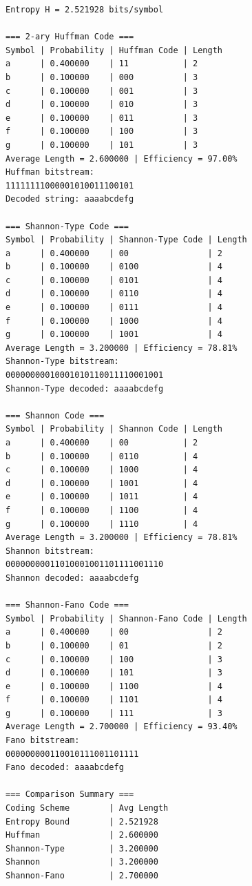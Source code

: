\documentclass{AnantDocumentation}
\begin{document}
\begin{lstlisting}
Entropy H = 2.521928 bits/symbol

=== 2-ary Huffman Code ===
Symbol | Probability | Huffman Code | Length
a      | 0.400000    | 11           | 2
b      | 0.100000    | 000          | 3
c      | 0.100000    | 001          | 3
d      | 0.100000    | 010          | 3
e      | 0.100000    | 011          | 3
f      | 0.100000    | 100          | 3
g      | 0.100000    | 101          | 3
Average Length = 2.600000 | Efficiency = 97.00%
Huffman bitstream:
11111111000001010011100101
Decoded string: aaaabcdefg

=== Shannon-Type Code ===
Symbol | Probability | Shannon-Type Code | Length
a      | 0.400000    | 00                | 2
b      | 0.100000    | 0100              | 4
c      | 0.100000    | 0101              | 4
d      | 0.100000    | 0110              | 4
e      | 0.100000    | 0111              | 4
f      | 0.100000    | 1000              | 4
g      | 0.100000    | 1001              | 4
Average Length = 3.200000 | Efficiency = 78.81%
Shannon-Type bitstream:
00000000010001010110011110001001
Shannon-Type decoded: aaaabcdefg

=== Shannon Code ===
Symbol | Probability | Shannon Code | Length
a      | 0.400000    | 00           | 2
b      | 0.100000    | 0110         | 4
c      | 0.100000    | 1000         | 4
d      | 0.100000    | 1001         | 4
e      | 0.100000    | 1011         | 4
f      | 0.100000    | 1100         | 4
g      | 0.100000    | 1110         | 4
Average Length = 3.200000 | Efficiency = 78.81%
Shannon bitstream:
00000000011010001001101111001110
Shannon decoded: aaaabcdefg

=== Shannon-Fano Code ===
Symbol | Probability | Shannon-Fano Code | Length
a      | 0.400000    | 00                | 2
b      | 0.100000    | 01                | 2
c      | 0.100000    | 100               | 3
d      | 0.100000    | 101               | 3
e      | 0.100000    | 1100              | 4
f      | 0.100000    | 1101              | 4
g      | 0.100000    | 111               | 3
Average Length = 2.700000 | Efficiency = 93.40%
Fano bitstream:
000000000110010111001101111
Fano decoded: aaaabcdefg

=== Comparison Summary ===
Coding Scheme        | Avg Length
Entropy Bound        | 2.521928
Huffman              | 2.600000
Shannon-Type         | 3.200000
Shannon              | 3.200000
Shannon-Fano         | 2.700000
\end{lstlisting}
\end{document}
